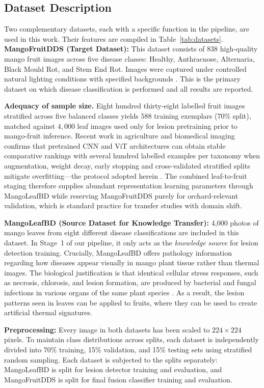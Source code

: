 \documentclass[utf8]{FrontiersinHarvard} %
\begin{document}
\subsection{Dataset Description}
Two complementary datasets, each with a specific function in the pipeline, are used in this work. Their features are compiled in Table~\ref{tab:datasets}.
\textbf{MangoFruitDDS (Target Dataset):} This dataset consists of 838 high-quality mango fruit images across five disease classes: Healthy, Anthracnose, Alternaria, Black Mould Rot, and Stem End Rot. Images were captured under controlled natural lighting conditions with specified backgrounds \cite{MendeleyDataset}. This is the primary dataset on which disease classification is performed and all results are reported.

\textbf{Adequacy of sample size.} Eight hundred thirty-eight labelled fruit images stratified across five balanced classes yields $588$ training exemplars ($70$\% split), matched against $4{,}000$ leaf images used only for lesion pretraining prior to mango-fruit inference. Recent work in agriculture and biomedical imaging confirms that pretrained CNN and ViT architectures can obtain stable comparative rankings with several hundred labelled examples per taxonomy when augmentation, weight decay, early stopping and cross-validated stratified splits mitigate overfitting---the protocol adopted herein \cite{shorten2019,thakur2022,noon2020}. The combined leaf-to-fruit staging therefore supplies abundant representation learning parameters through MangoLeafBD while reserving MangoFruitDDS purely for orchard-relevant validation, which is standard practice for transfer studies with domain shift.

\textbf{MangoLeafBD (Source Dataset for Knowledge Transfer):} 4,000 photos of mango leaves from eight different disease classifications are included in this dataset. In Stage~1 of our pipeline, it only acts as the \textit{knowledge source} for lesion detection training. Crucially, MangoLeafBD offers pathology information regarding how diseases appear visually in mango plant tissue rather than thermal images. The biological justification is that identical cellular stress responses, such as necrosis, chlorosis, and lesion formation, are produced by bacterial and fungal infections in various organs of the same plant species \cite{bock2010,savary2019}. As a result, the lesion patterns seen in leaves can be applied to fruits, where they can be used to create artificial thermal signatures.

\textbf{Preprocessing:} Every image in both datasets has been scaled to $224 \times 224$ pixels. To maintain class distributions across splits, each dataset is independently divided into 70\% training, 15\% validation, and 15\% testing sets using stratified random sampling. Each dataset is subjected to the splits separately: MangoLeafBD is split for lesion detector training and evaluation, and MangoFruitDDS is split for final fusion classifier training and evaluation.
\end{document}
